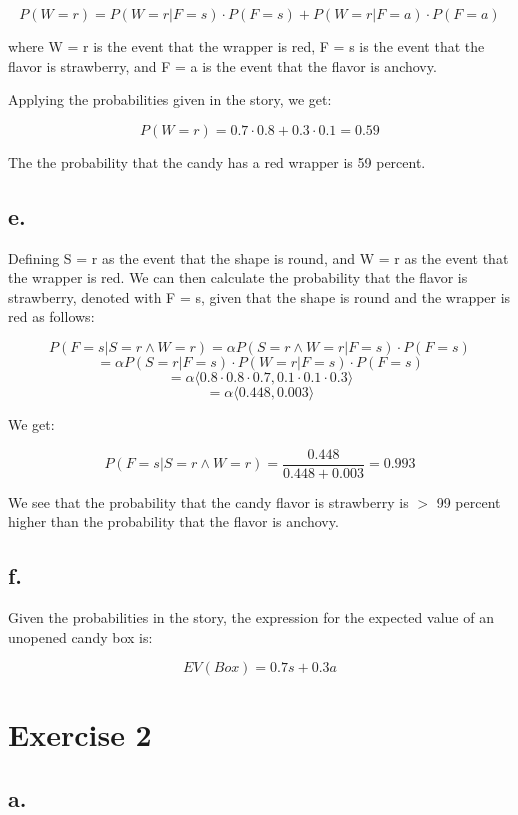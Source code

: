\documentclass{article}
\begin{document}
\[P(W = r) = P(W = r | F = s) \cdot P(F = s) + P(W = r | F = a) \cdot P(F = a)\]

where W = r is the event that the wrapper is red, F = s is the event that the flavor is strawberry, and F = a is the event that the flavor is anchovy.

Applying the probabilities given in the story, we get:

\[P(W = r) = 0.7 \cdot 0.8 + 0.3 \cdot 0.1 = 0.59\]

The the probability that the candy has a red wrapper is 59 percent.


\subsection*{e.}

Defining S = r as the event that the shape is round, and W = r as the event that the wrapper is red. We can then calculate the probability that the flavor is strawberry, denoted with F = s, given that the shape is round and the wrapper is red as follows:

\[P(F = s | S = r \wedge W = r) = \alpha P(S = r \wedge W = r | F = s) \cdot P(F = s)\]
\[= \alpha P(S = r | F = s) \cdot P(W = r | F = s) \cdot P(F = s)\]
\[= \alpha \langle 0.8 \cdot 0.8 \cdot 0.7, 0.1 \cdot 0.1 \cdot 0.3 \rangle \]
\[= \alpha \langle 0.448, 0.003 \rangle\]

We get:

\[P(F = s | S = r \wedge W = r) = \dfrac{0.448}{0.448 + 0.003} = 0.993\]

We see that the probability that the candy flavor is strawberry is \(>\) 99 percent higher than the probability that the flavor is anchovy.

\subsection*{f.}

Given the probabilities in the story, the expression for the expected value of an unopened candy box is:

\[EV(Box) = 0.7s + 0.3a\]


\section*{Exercise 2}

\subsection*{a.}
\end{document}
